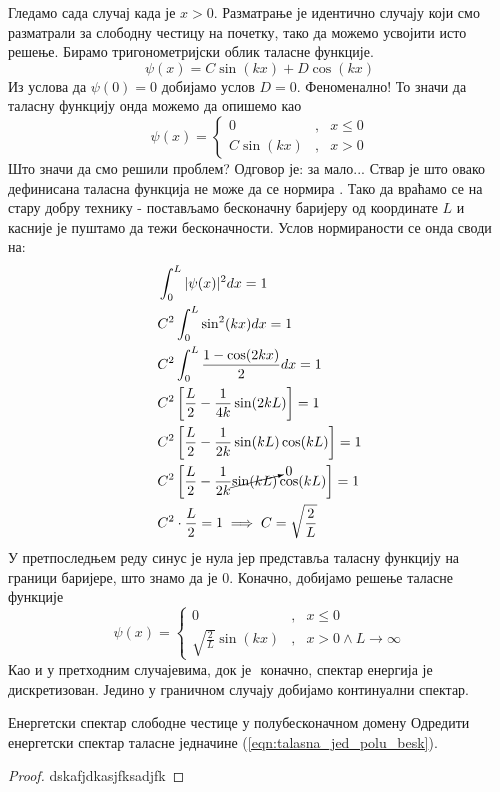 \documentclass{tufte-handout} %
\theoremstyle{definition}
\theoremstyle{remark}
\begin{document}
Гледамо сада случај када је $x>0$. Разматрање је идентично случају који смо разматрали за слободну честицу на почетку, тако да можемо усвојити исто решење. Бирамо тригонометријски облик таласне функције.
\begin{equation*}
	\psi(x)=C\sin(kx) + D\cos(kx)
\end{equation*}
Из услова да $\psi(0)=0$ добијамо услов $D=0$. Феноменално! То значи да таласну функцију онда можемо да опишемо као
\begin{equation}
	\psi(x) = \left\{ \begin{array}{rcl}
		0 & \mbox{,}
		& x\leq0 \\ 
		C\sin(kx) & \mbox{,} & x>0
	\end{array}\right.
\end{equation}
Што значи да смо решили проблем? Одговор је: за мало... Ствар је што овако дефинисана таласна функција не може да се нормира \Sadey. Тако да враћамо се на стару добру технику - постављамо бесконачну баријеру од координате $L$ и касније је пуштамо да тежи бесконачности. Услов нормираности се онда своди на:
\begin{align*}
	&\int_{0}^{L}|\psi(x)|^2dx = 1\\
	&C^2\int_{0}^{L}\sin^2(kx)dx=1\\
	&C^2\int_{0}^{L}\frac{1-\cos(2kx)}{2}dx=1\\
	&C^2\left[\frac{L}{2}-\frac{1}{4k}\sin(2kL)\right]=1\\
	&C^2\left[\frac{L}{2}-\frac{1}{2k}\sin(kL)\cos(kL)\right]=1\\
	&C^2\left[\frac{L}{2}-\frac{1}{2k}\cancelto{0}{\sin(kL)}\cos(kL)\right]=1\\
	&C^2\cdot\frac{L}{2}=1\implies C=\sqrt{\frac{2}{L}}
\end{align*}
У претпоследњем реду синус је нула јер представља таласну функцију на граници баријере, што знамо да је 0. Коначно, добијамо решење таласне функције
\begin{equation}\label{eqn:talasna_jed_polu_besk}
	\psi(x) = \left\{ \begin{array}{rcl}
		0 & \mbox{,}
		& x\leq0 \\ 
		\sqrt{\frac{2}{L}}\sin(kx) & \mbox{,} & x>0 \wedge L\rightarrow\infty
	\end{array}\right.
\end{equation}
Као и у претходним случајевима, док је $ $ коначно, спектар енергија је дискретизован. Једино у граничном случају добијамо континуални спектар.
\begin{zadatak}{Енергетски спектар слободне честице у полубесконачном домену}{}
	Одредити енергетски спектар таласне једначине (\ref{eqn:talasna_jed_polu_besk}).
\end{zadatak}
\begin{proof}
	dskafjdkasjfksadjfk
\end{proof}
\end{document}
